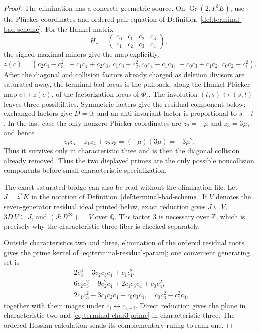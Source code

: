 \begin{proof}
The elimination has a concrete geometric source.  On
\(\operatorname{Gr}(2,\Gamma^3E)\), use the Plücker coordinates and
ordered-pair equation of Definition~\ref{def:terminal-bad-scheme}.
For the Hankel matrix
\[
 H_c=\begin{pmatrix}c_0&c_1&c_2&c_3\\c_1&c_2&c_3&c_4\end{pmatrix},
\]
the signed maximal minors give the map explicitly:
\[
 z(c)=(c_2c_4-c_3^2,\,-c_1c_4+c_2c_3,\,c_1c_3-c_2^2,
 c_0c_4-c_1c_3,\,-c_0c_3+c_1c_2,\,c_0c_2-c_1^2).
\]
After the diagonal and collision factors already charged as deletion
divisors are saturated away, the terminal bad locus is the pullback, along
the Hankel Plücker map \(c\mapsto z(c)\), of the factorization locus of
\(\Phi_z\).  The involution \((t,s)\leftrightarrow(s,t)\) leaves three
possibilities.  Symmetric factors give the residual component below;
exchanged factors give \(D=0\); and an anti-invariant factor is proportional
to \(s-t\).  In the last case the only nonzero Plücker coordinates are
\(z_2=-\mu\) and \(z_3=3\mu\), and hence
\[
 z_0z_5-z_1z_4+z_2z_3=(-\mu)(3\mu)=-3\mu^2.
\]
Thus it
survives only in characteristic three and is then the diagonal collision
already removed.  Thus the two displayed primes are the only possible
noncollision components before small-characteristic specialization.

The exact saturated bridge can also be read without the elimination file.
Let \(J=z^*K\) in the notation of
Definition~\ref{def:terminal-bad-scheme}.
If \(V\) denotes the seven-generator residual ideal printed below, exact
reduction gives \(J\subseteq V\), \(3D\,V\subseteq J\), and
\((J:D^\infty)=V\) over \(\mathbb Q\).  The factor \(3\) is necessary over
\(\mathbb Z\), which is precisely why the characteristic-three fiber is
checked separately.

Outside characteristics two and three, elimination of the ordered residual
roots gives the prime kernel of \eqref{eq:terminal-residual-param}; one
convenient generating set is
\begin{align*}
&2c_3^3-3c_2c_3c_4+c_1c_4^2,\\
&6c_2c_3^2-9c_2^2c_4+2c_1c_3c_4+c_0c_4^2,\\
&2c_1c_3^2-3c_1c_2c_4+c_0c_3c_4,\quad
  c_0c_3^2-c_1^2c_4,
\end{align*}
together with their images under \(c_i\leftrightarrow c_{4-i}\).  Direct
reduction gives the plane in characteristic two and
\eqref{eq:terminal-char3-prime} in characteristic
three.  The ordered-Hessian calculation sends its complementary ruling to
rank one.


\end{proof}
